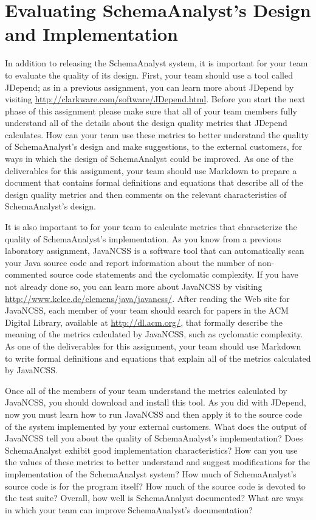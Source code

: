 \section*{Evaluating SchemaAnalyst's Design and Implementation}

In addition to releasing the SchemaAnalyst system, it is important for your team to evaluate the quality of its design.
First, your team should use a tool called JDepend; as in a previous assignment, you can learn more about JDepend by
visiting \url{http://clarkware.com/software/JDepend.html}.  Before you start the next phase of this assignment please
make sure that all of your team members fully understand all of the details about the design quality metrics that
JDepend calculates.  How can your team use these metrics to better understand the quality of SchemaAnalyst's design and
make suggestions, to the external customers, for ways in which the design of SchemaAnalyst could be improved. As one of
the deliverables for this assignment, your team should use Markdown to prepare a document that contains formal
definitions and equations that describe all of the design quality metrics and then comments on the relevant
characteristics of SchemaAnalyst's design.

It is also important to for your team to calculate metrics that characterize the quality of SchemaAnalyst's
implementation.  As you know from a previous laboratory assignment, JavaNCSS is a software tool that can automatically
scan your Java source code and report information about the number of non-commented source code statements and the
cyclomatic complexity.  If you have not already done so, you can learn more about JavaNCSS by visiting
\url{http://www.kclee.de/clemens/java/javancss/}. After reading the Web site for JavaNCSS, each member of your team
should search for papers in the ACM Digital Library, available at \url{http://dl.acm.org/}, that formally describe the
meaning of the metrics calculated by JavaNCSS, such as cyclomatic complexity. As one of the deliverables for this
assignment, your team should use Markdown to write formal definitions and equations that explain all of the metrics
calculated by JavaNCSS.

Once all of the members of your team understand the metrics calculated by JavaNCSS, you should download and install this
tool.  As you did with JDepend, now you must learn how to run JavaNCSS and then apply it to the source code of the
system implemented by your external customers.  What does the output of JavaNCSS tell you about the quality of
SchemaAnalyst's implementation? Does SchemaAnalyst exhibit good implementation characteristics? How can you use the
values of these metrics to better understand and suggest modifications for the implementation of the SchemaAnalyst
system? How much of SchemaAnalyst's source code is for the program itself? How much of the source code is devoted to the
test suite?  Overall, how well is SchemaAnalyst documented? What are ways in which your team can improve SchemaAnalyst's
documentation?

